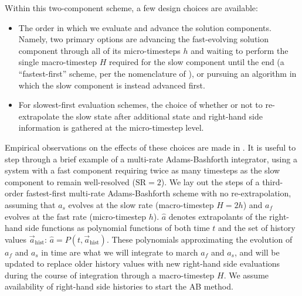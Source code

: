 Within this two-component scheme, a few design choices are available:
\begin{itemize}
\item The order in which we evaluate and advance the solution components.
	Namely, two primary options are advancing the fast-evolving solution
	component through all of its micro-timesteps $h$ and waiting to perform
	the single macro-timestep $H$ required for the slow component until the
	end (a ``fastest-first'' scheme, per the nomenclature of
	\cite{gear1984multirate}), or pursuing an algorithm in which the slow
	component is instead advanced first.
\item For slowest-first evaluation schemes, the choice of whether or not to
	re-extrapolate the slow state after additional state and right-hand
	side information is gathered at the micro-timestep level.
\end{itemize}
Empirical observations on the effects of these choices are made
in \cite{klockner2010high}. It is useful to step through a brief example
of a multi-rate Adams-Bashforth integrator, using a system with a
fast component requiring twice as many timesteps as the slow component
to remain well-resolved ($\text{SR}=2$).  We lay out the steps of a third-order
fastest-first multi-rate Adams-Bashforth scheme with no re-extrapolation, assuming that $a_{s}$
evolves at the slow rate (macro-timestep $H = 2h$) and $a_{f}$ evolves at the
fast rate (micro-timestep $h$).  $\hat{a}$ denotes extrapolants of the
right-hand side functions as polynomial functions of both time $t$ and the set
of history values $\vec{a}_{\text{hist}}$: $\hat{a} = P(t,
\vec{a}_{\text{hist}})$.  These polynomials approximating the evolution of
$a_{f}$ and $a_{s}$ in time are what we will integrate to march $a_{f}$ and
$a_{s}$, and will be updated to replace older history values with new
right-hand side evaluations during the course of integration through a
macro-timestep $H$.  We assume availability of right-hand side histories to
start the AB method.
